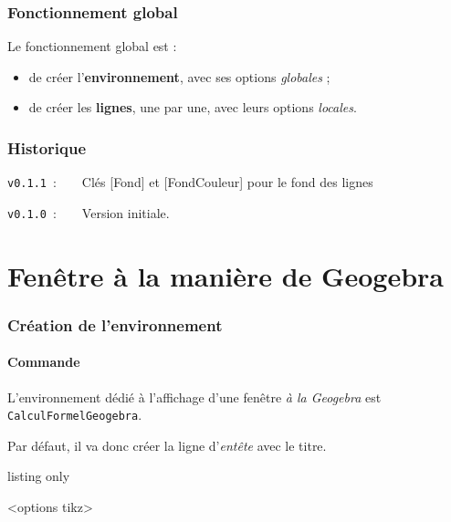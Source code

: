 \documentclass[french,a4paper,11pt]{article}
\begin{document}
\section{Fonctionnement global}

\begin{importantblock}
Le fonctionnement global est :

\begin{itemize}
	\item de créer l'\textbf{environnement}, avec ses options \textit{globales} ;
	\item de créer les \textbf{lignes}, une par une, avec leurs options \textit{locales}.
\end{itemize}
\vspace*{-\baselineskip}\leavevmode
\end{importantblock}

\vfill

\section{Historique}

\verb|v0.1.1|~:~~~~Clés [Fond] et [FondCouleur] pour le fond des lignes

\verb|v0.1.0|~:~~~~Version initiale.

\hspace*{1cm}

\pagebreak

\part{Fenêtre à la manière de Geogebra}

\section{Création de l'environnement}

\subsection{Commande}

\begin{cautionblock}
L'environnement dédié à l'affichage d'une fenêtre \textit{à la Geogebra} est \texttt{CalculFormelGeogebra}.

Par défaut, il va donc créer la ligne d'\textit{entête} avec le titre.
\end{cautionblock}

\begin{PresentationCode}{listing only}
\begin{CalculFormelGeogebra}<options tikz>
\end{CalculFormelGeogebra}
\end{PresentationCode}
\end{document}
